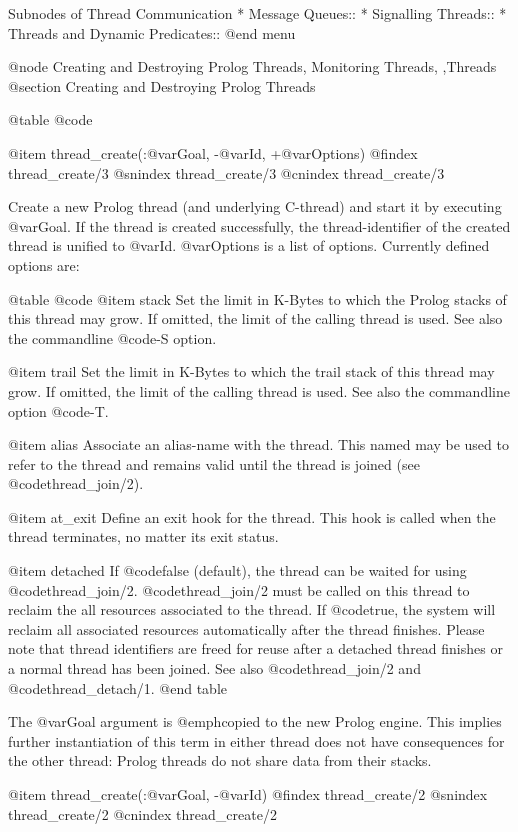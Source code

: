 {{{{{{{{Subnodes of Thread Communication
* Message Queues::
* Signalling Threads::            
* Threads and Dynamic Predicates::   
@end menu

@node Creating and Destroying Prolog Threads, Monitoring Threads, ,Threads
@section Creating and Destroying Prolog Threads

@table @code

@item thread_create(:@var{Goal}, -@var{Id}, +@var{Options})
@findex thread_create/3
@snindex thread_create/3
@cnindex thread_create/3

Create a new Prolog thread (and underlying C-thread) and start it
by executing @var{Goal}.  If the thread is created successfully, the
thread-identifier of the created thread is unified to @var{Id}.
@var{Options} is a list of options.  Currently defined options are:

@table @code
    @item stack
Set the limit in K-Bytes to which the Prolog stacks of
this thread may grow.  If omitted, the limit of the calling thread is
used.  See also the  commandline @code{-S} option.

    @item trail
Set the limit in K-Bytes to which the trail stack of this thread may
grow.  If omitted, the limit of the calling thread is used. See also the
commandline option @code{-T}.

    @item alias
Associate an alias-name with the thread.  This named may be used to
refer to the thread and remains valid until the thread is joined
(see @code{thread_join/2}).

    @item at_exit
Define an exit hook for the thread.  This hook is called when the thread
terminates, no matter its exit status.

    @item detached
If @code{false} (default), the thread can be waited for using
@code{thread_join/2}. @code{thread_join/2} must be called on this thread
to reclaim the all resources associated to the thread. If @code{true},
the system will reclaim all associated resources automatically after the
thread finishes. Please note that thread identifiers are freed for reuse
after a detached thread finishes or a normal thread has been joined.
See also @code{thread_join/2} and @code{thread_detach/1}.
@end table

The @var{Goal} argument is @emph{copied} to the new Prolog engine.
This implies further instantiation of this term in either thread does
not have consequences for the other thread: Prolog threads do not share
data from their stacks.

@item thread_create(:@var{Goal}, -@var{Id})
@findex thread_create/2
@snindex thread_create/2
@cnindex thread_create/2

}}}}}}}}
